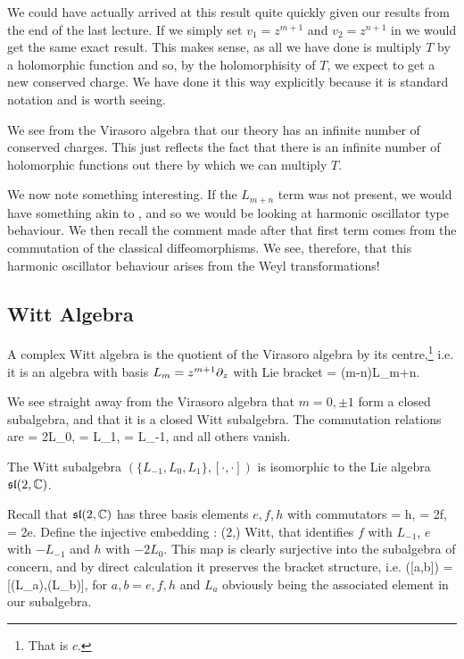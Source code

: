 \br 
    We could have actually arrived at this result quite quickly given our results from the end of the last lecture. If we simply set $v_1=z^{m+1}$ and $v_2=z^{n+1}$ in  we would get the same exact result. This makes sense, as all we have done is multiply $T$ by a holomorphic function and so, by the holomorphisity of $T$, we expect to get a new conserved charge. We have done it this way explicitly because it is standard notation and is worth seeing.
\er 

\br 
    We see from the Virasoro algebra that our theory has an infinite number of conserved charges. This just reflects the fact that there is an infinite number of holomorphic functions out there by which we can multiply $T$.
\er 

We now note something interesting. If the $L_{m+n}$ term was not present, we would have something akin to , and so we would be looking at harmonic oscillator type behaviour. We then recall the comment made after  that first term comes from the commutation of the classical diffeomorphisms. We see, therefore, that this harmonic oscillator behaviour arises from the Weyl transformations!

\subsection{Witt Algebra}

\bd 
    A complex Witt algebra is the quotient of the Virasoro algebra by its centre,\footnote{That is $c$.} i.e. it is an algebra with basis $L_m = z^{m+1}\partial_z$ with Lie bracket 
    \bse
        [L_m,L_n] = (m-n)L_{m+n}.
    \ese 
\ed 

We see straight away from the Virasoro algebra that $m=0,\pm1$ form a closed subalgebra, and that it is a closed Witt subalgebra. The commutation relations are
\bse 
    [L_1,L_{-1}] = 2L_0, \qquad [L_1,L_0] = L_1, \qquad  [L_0,L_{-1}] = L_{-1},
\ese
and all others vanish.

\bp 
    The Witt subalgebra $(\{L_{-1},L_0,L_1\},[\cdot,\cdot])$ is isomorphic to the Lie algebra $\mathfrak{sl}(2,\mathbb{C})$.
\ep 

\bq 
    Recall that $\mathfrak{sl}(2,\mathbb{C})$ has three basis elements $e,f,h$ with commutators 
    \bse 
        [e,f] = h, \qquad [f,h] = 2f, \qquad [h,e] = 2e.
    \ese 
    Define the injective embedding
    \bse 
        \iota : (2,\C) \hookrightarrow Witt,
    \ese 
    that identifies $f$ with $L_{-1}$, $e$ with $-L_{-1}$ and $h$ with $-2L_0$. This map is clearly surjective into the subalgebra of concern, and by direct calculation it preserves the bracket structure, i.e. 
    \bse 
        \iota([a,b]) = [\iota(L_a),\iota(L_b)],
    \ese 
    for $a,b=e,f,h$ and $L_a$ obviously being the associated element in our subalgebra. 
\eq 

